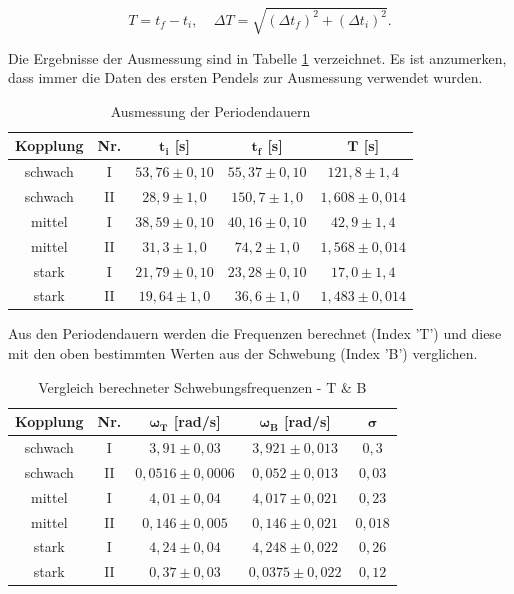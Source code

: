 \documentclass{article}
\begin{document}
\begin{equation}
    T = t_f - t_i, \ \ \ \ \ \Delta T = \sqrt{(\Delta t_f)^2 + (\Delta t_i)^2}.
\end{equation}

Die Ergebnisse der Ausmessung sind in Tabelle \ref{tab:Perioden} verzeichnet. Es ist anzumerken, dass immer die Daten des ersten Pendels zur Ausmessung verwendet wurden.

\phantom{.}

\begin{table}[!h]
    \centering
    \begin{tabular}{ccccc}
        \hline
        \textbf{Kopplung} & \textbf{Nr.} & $\bm{t_i}$ [s]& $\bm{t_f}$ [s] & $\bm{T}$ [s] \\ \hline
        schwach & I & $53,76 \pm 0,10$ & $55,37 \pm 0,10$ & $121,8 \pm 1,4$  \\
        schwach & II & $28,9 \pm 1,0$ & $150,7 \pm 1,0$ & $1,608 \pm 0,014$  \\
        mittel & I & $38,59 \pm 0,10$ & $40,16 \pm 0,10$ & $42,9 \pm 1,4$  \\
        mittel & II & $31,3 \pm 1,0$ & $74,2 \pm 1,0$ & $1,568 \pm 0,014$  \\
        stark & I & $21,79 \pm 0,10$ & $23,28 \pm 0,10$ & $17,0 \pm 1,4$  \\
        stark & II & $19,64 \pm 1,0$ & $36,6 \pm 1,0$ & $1,483 \pm 0,014$  \\ \hline
    \end{tabular}%
    \caption{Ausmessung der Periodendauern}
    \label{tab:Perioden}
\end{table}

\phantom{.}

Aus den Periodendauern werden die Frequenzen berechnet (Index 'T') und diese mit den oben bestimmten Werten aus der Schwebung (Index 'B') verglichen.

\phantom{.}

\begin{table}[!h]
    \centering
    \begin{tabular}{ccccc}
        \hline
        \textbf{Kopplung} & \textbf{Nr.} & $\bm{\omega_T}$ [rad/s]& $\bm{\omega_B}$ [rad/s]& $\bm{\sigma}$  \\ \hline
        schwach & I & $3,91 \pm 0,03$       & $3,921 \pm 0,013$ & $0,3$  \\
        schwach & II & $0,0516 \pm 0,0006$  & $0,052 \pm 0,013$ & $0,03$  \\
        mittel & I & $4,01 \pm 0,04$        & $4,017 \pm 0,021$ & $0,23$  \\
        mittel & II & $0,146 \pm 0,005$     & $0,146 \pm 0,021$ & $0,018$  \\
        stark & I & $4,24 \pm 0,04$         & $4,248 \pm 0,022$ & $0,26$  \\
        stark & II & $0,37 \pm 0,03$        & $0,0375 \pm 0,022$ & $0,12$  \\ \hline
    \end{tabular}%
    \caption{Vergleich berechneter Schwebungsfrequenzen - T \& B}
    \label{tab:VGLfreq_T_B}
\end{table}
\end{document}
